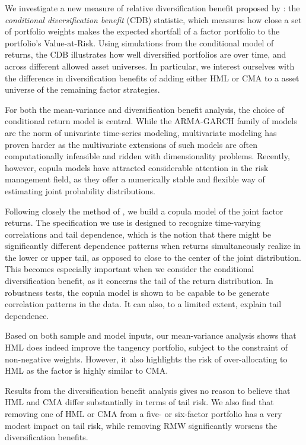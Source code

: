 We investigate a new measure of relative diversification benefit proposed by \textcite{ChristoffersenErrunzaJacobLanglois2012}: the \emph{conditional diversification benefit} (CDB) statistic, which measures how close a set of portfolio weights makes the expected shortfall of a factor portfolio to the portfolio's Value-at-Risk. Using simulations from the conditional model of returns, the CDB illustrates how well diversified portfolios are over time, and across different allowed asset universes. In particular, we interest ourselves with the difference in diversification benefits of adding either HML or CMA to a asset universe of the remaining factor strategies.

For both the mean-variance and diversification benefit analysis, the choice of conditional return model is central. While the ARMA-GARCH family of models are the norm of univariate time-series modeling, multivariate modeling has proven harder as the multivariate extensions of such models are often computationally infeasible and ridden with dimensionality problems. Recently, however, copula models have attracted considerable attention in the risk management field, as they offer a numerically stable and flexible way of estimating joint probability distributions. 

Following closely the method of \textcite{ChristoffersenLanglois2013}, we build a copula model of the joint factor returns. The specification we use is designed to recognize time-varying correlations and tail dependence, which is the notion that there might be significantly different dependence patterns when returns simultaneously realize in the lower or upper tail, as opposed to close to the center of the joint distribution. This becomes especially important when we consider the conditional diversification benefit, as it concerns the tail of the return distribution. In robustness tests, the copula model is shown to be capable to be generate correlation patterns in the data. It can also, to a limited extent, explain tail dependence.

Based on both sample and model inputs, our mean-variance analysis shows that HML does indeed improve the tangency portfolio, subject to the constraint of non-negative weights. However, it also highlights the risk of over-allocating to HML as the factor is highly similar to CMA.

Results from the diversification benefit analysis gives no reason to believe that HML and CMA differ substantially in terms of tail risk. We also find that removing one of HML or CMA from a five- or six-factor portfolio has a very modest impact on tail risk, while removing RMW significantly worsens the diversification benefits.

